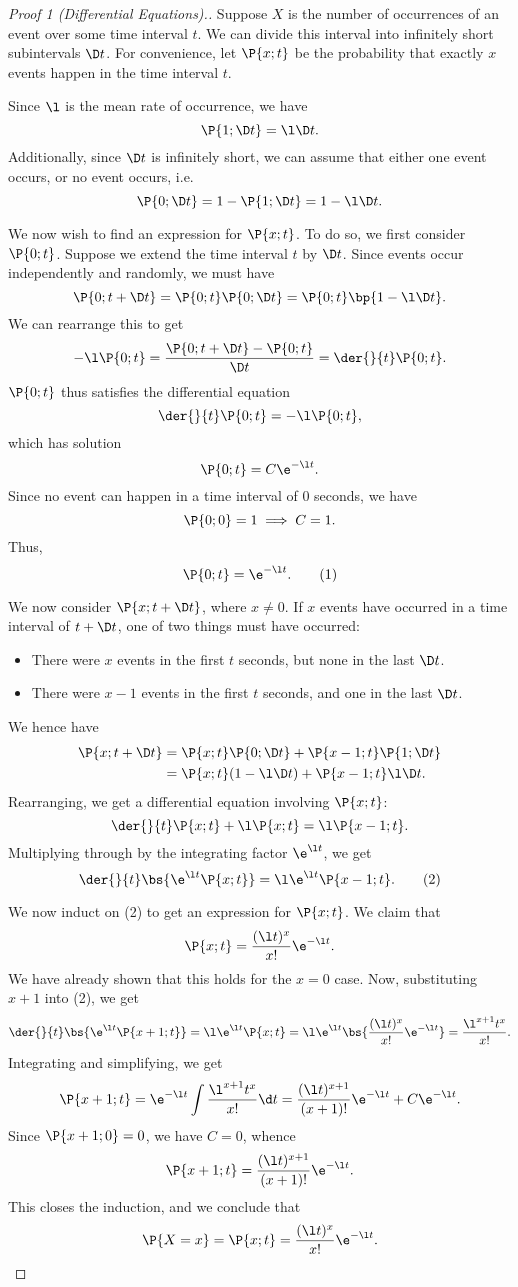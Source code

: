 \begin{proof}[Proof 1 (Differential Equations).]
    Suppose $X$ is the number of occurrences of an event over some time interval $t$. We can divide this interval into infinitely short subintervals $\D t$. For convenience, let $\P{x; t}$ be the probability that exactly $x$ events happen in the time interval $t$.

    Since $\l$ is the mean rate of occurrence, we have \[\P{1; \D t} = \l \D t.\] Additionally, since $\D t$ is infinitely short, we can assume that either one event occurs, or no event occurs, i.e. \[\P{0; \D t} = 1 - \P{1; \D t} = 1 - \l \D t.\]

    We now wish to find an expression for $\P{x;t}$. To do so, we first consider $\P{0;t}$. Suppose we extend the time interval $t$ by $\D t$. Since events occur independently and randomly, we must have \[\P{0;t + \D t} = \P{0; t} \P{0; \D t} = \P{0;t} \bp{1 - \l \D t}.\] We can rearrange this to get \[-\l \P{0;t} = \frac{\P{0;t + \D t} - \P{0;t}}{\D t} = \der{}{t} \P{0;t}.\] $\P{0;t}$ thus satisfies the differential equation \[\der{}{t} \P{0;t} = -\l \P{0;t},\] which has solution \[\P{0;t} = C \e^{-\l t}.\] Since no event can happen in a time interval of 0 seconds, we have \[\P{0;0} = 1 \implies C = 1.\] Thus, \[\P{0; t} = \e^{-\l t}. \tag{1}\]

    We now consider $\P{x;t + \D t}$, where $x \neq 0$. If $x$ events have occurred in a time interval of $t + \D t$, one of two things must have occurred:
    \begin{itemize}
        \item There were $x$ events in the first $t$ seconds, but none in the last $\D t$.
        \item There were $x-1$ events in the first $t$ seconds, and one in the last $\D t$.
    \end{itemize}
    We hence have
    \begin{align*}
        \P{x; t + \D t} &= \P{x;t}\P{0;\D t} + \P{x-1 ; t} \P{1; \D t}\\
        &= \P{x;t} (1 - \l \D t) + \P{x-1;t} \l \D t.
    \end{align*}
    Rearranging, we get a differential equation involving $\P{x;t}$: \[\der{}{t} \P{x;t} + \l \P{x;t} = \l \P{x-1;t}.\] Multiplying through by the integrating factor $\e^{\l t}$, we get \[\der{}{t} \bs{\e^{\l t }\P{x;t}} = \l \e^{\l t} \P{x-1;t}. \tag{2}\]
    
    We now induct on (2) to get an expression for $\P{x;t}$. We claim that \[\P{x;t} = \frac{(\l t)^x}{x!} \e^{-\l t}.\] We have already shown that this holds for the $x = 0$ case. Now, substituting $x + 1$ into (2), we get \[\der{}{t} \bs{\e^{\l t }\P{x+1;t}} = \l \e^{\l t} \P{x;t} = \l \e^{\l t} \bs{\frac{(\l t)^x}{x!} \e^{-\l t}} = \frac{\l^{x+1} t^x}{x!}.\] Integrating and simplifying, we get \[\P{x+1;t} = \e^{-\l t} \int \frac{\l^{x+1} t^x}{x!} \d t = \frac{(\l t)^{x+1}}{(x+1)!} \e^{-\l t} + C \e^{-\l t}.\] Since $\P{x+1;0} = 0$, we have $C = 0$, whence \[\P{x+1;t} = \frac{(\l t)^{x+1}}{(x+1)!} \e^{-\l t}.\] This closes the induction, and we conclude that \[\P{X = x} = \P{x;t} = \frac{(\l t)^x}{x!} \e^{-\l t}.\]
\end{proof}

